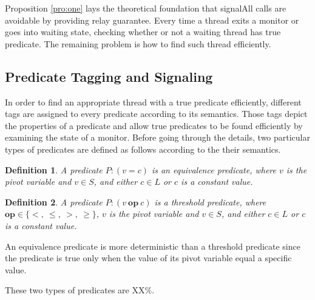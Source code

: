 \documentclass[preprint]{sigplanconf}
\newtheorem{definition}{Definition}
\begin{document}
Proposition \ref{pro:one} lays the theoretical foundation that signalAll calls
are avoidable by providing relay guarantee. Every time a
thread exits a monitor or goes into waiting state, checking whether or not a
waiting thread has true predicate. The remaining problem is how to find such
thread efficiently. 
\subsection{Predicate Tagging and Signaling}
In order to find an appropriate thread with a true predicate efficiently, 
different tags are assigned to every predicate according to its semantics. 
Those tags depict the properties of a predicate and allow true predicates to be 
found efficiently by examining the state of a monitor. Before going through the 
details, two particular types of predicates are defined as follows according to
the their semantics. 
\begin{definition}
    A predicate $P: (v = c)$ is an equivalence predicate, where $v$ is the
    pivot variable and $v \in S$, and either $c \in L$ or $c$ is a constant 
    value.
\end{definition}
\begin{definition}
   A predicate $P: (v\ \boldsymbol{op}\ c)$ is a threshold predicate, where 
   $\boldsymbol{op}
    \in \{<,\ \le,\ >,\ \ge\}$, $v$ is the pivot variable and $v \in S$, and 
    either $c \in L$ or $c$ is a constant value.
\end{definition}
An equivalence predicate is more deterministic than a threshold predicate since 
the predicate is true only when the value of its pivot variable equal a
specific value. 

These two types of predicates are XX\%. 
\end{document}
